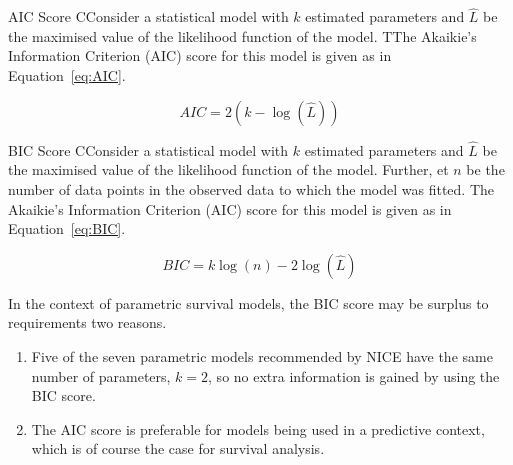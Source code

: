 \begin{definition}[label=def:AIC]{AIC Score}
    CConsider a statistical model with $k$ estimated parameters and $\hat{L}$ be the maximised value of the likelihood function of the model. TThe Akaikie's Information Criterion (AIC) score for this model is given as in Equation~\ref{eq:AIC}.

    \begin{equation}
        AIC = 2(k - \log(\hat{L}))
        \label{eq:AIC}
    \end{equation}
\end{definition}

\begin{definition}[label=def:BIC]{BIC Score}
    CConsider a statistical model with $k$ estimated parameters and $\hat{L}$ be the maximised value of the likelihood function of the model. Further, et $n$ be the number of data points in the observed data to which the model was fitted. The Akaikie's Information Criterion (AIC) score for this model is given as in Equation~\ref{eq:BIC}.

    \begin{equation}
        BIC =  k\log(n) - 2\log(\hat{L})
        \label{eq:BIC}
    \end{equation}
\end{definition}

In the context of parametric survival models, the BIC score may be surplus to requirements two reasons.

\begin{enumerate}
    \item Five of the seven parametric models recommended by NICE have the same number of parameters, $k = 2$, so no extra information is gained by using the BIC score. \\
    \item The AIC score is preferable for models being used in a predictive context, which is of course the case for survival analysis.
\end{enumerate}

